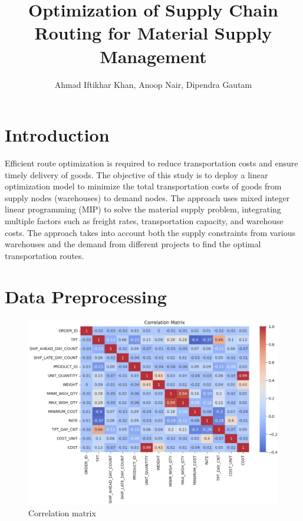 \documentclass{article}
\title{Optimization of Supply Chain Routing for Material Supply Management}
\author{Ahmad Iftikhar Khan, Anoop Nair, Dipendra Gautam }
\date{}
\begin{document}
\maketitle

\section{Introduction}

Efficient route optimization is required to reduce transportation costs and ensure timely delivery of goods. The objective of this study is to deploy a linear optimization model to minimize the total transportation costs of goods from supply nodes (warehouses) to demand nodes. The approach uses mixed integer linear programming (MIP) to solve the material supply problem, integrating multiple factors such as freight rates, transportation capacity, and warehouse costs. The approach takes into account both the supply constraints from various warehouses and the demand from different projects to find the optimal transportation routes.

\section{Data Preprocessing}


\begin{figure}[!h]
     \begin{center}
     \includegraphics[width=0.6\paperwidth]{correlation.png}
     \end{center}
     \caption{Correlation matrix}
     \label{fig:cd}
\end{figure}
\end{document}
